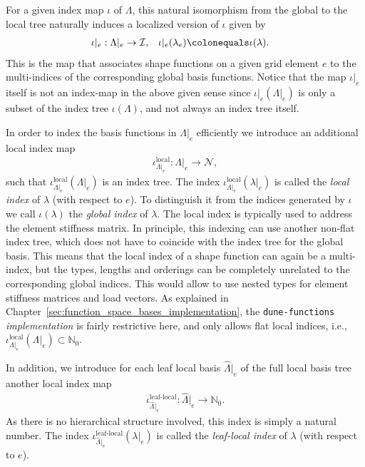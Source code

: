\documentclass[a4paper,10pt,headings=normal,bibliography=totoc]{scrartcl}
\newcommand{\dunemodule}[1]{\texttt{#1}}
\begin{document}
For a given index map $\iota$ of $\Lambda$,
this natural isomorphism from the global to the local tree
naturally induces a localized version of $\iota$ given by
\begin{align*}
  \iota|_e : \Lambda|_e &\to \mathcal{I}, &
  \iota|_e(\lambda_e) &\colonequals \iota(\lambda).
\end{align*}
This is the map that associates shape functions on a given grid element $e$ to
the multi-indices of the corresponding global basis functions.
Notice that the map $\iota|_e$ itself is not an index-map in the above given sense
since $\iota|_e(\Lambda|_e)$ is only a subset of the index tree $\iota(\Lambda)$,
and not always an index tree itself.

In order to index the basis functions in $\Lambda|_e$ efficiently we introduce
an additional local index map
\begin{align*}
  \iota^{\text{local}}_{\Lambda|_e}: \Lambda|_e \to \mathcal{N},
\end{align*}
such that $\iota^{\text{local}}_{\Lambda|_e}(\Lambda|_e)$ is an index tree.
The index $\iota^{\text{local}}_{\Lambda|_e}(\lambda|_e)$ is
called the \emph{local index} of $\lambda$ (with respect to $e$).
To distinguish it from the indices generated by $\iota$
we call $\iota(\lambda)$ the \emph{global index} of $\lambda$.
The local index is typically used to address the element stiffness matrix.
In principle, this indexing can use another non-flat index tree,
which does not have to coincide with the index tree for the global basis.
This means that the local index of a shape function can again be a multi-index, but the types,
lengths and orderings can be completely unrelated to the corresponding global indices.
This would allow to use nested types for element stiffness matrices and load vectors.
As explained in Chapter~\ref{sec:function_space_bases_implementation},
the \dunemodule{dune-functions} \emph{implementation} is fairly restrictive here,
and only allows flat local indices, i.e.,
$\iota^{\text{local}}_{\Lambda|_e}(\Lambda|_e) \subset \mathbb{N}_0.$

In addition, we introduce for each leaf local basis $\hat{\Lambda}|_e$
of the full local basis tree another local index map
\begin{align*}
  \iota^{\text{leaf-local}}_{\hat{\Lambda}|_e}: \hat{\Lambda}|_e \to \mathbb{N}_0.
\end{align*}
As there is no hierarchical structure involved, this index is simply a
natural number.
The index $\iota^{\text{leaf-local}}_{\hat{\Lambda}|_e}(\lambda|_e)$ is
called the \emph{leaf-local index} of $\lambda$ (with respect to $e$).
\end{document}
